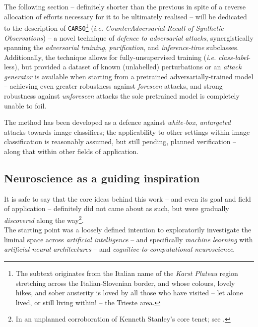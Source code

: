 

The following section -- definitely shorter than the previous in spite of a reverse allocation of efforts necessary for it to be ultimately realised -- will be dedicated to the description of \texttt{CARSO}\footnote{The subtext originates from the Italian name of the \textit{Karst Plateau} region stretching across the Italian-Slovenian border, and whose colours, lovely hikes, and sober austerity is loved by all those who have visited -- let alone lived, or still living within! --  the Trieste area.} (\textit{i.e.} \textit{CounterAdversarial Recall of Synthetic Observations}) -- a novel technique of \textit{defence to adversarial attacks}, synergistically spanning the \textit{adversarial training}, \textit{purification}, and \textit{inference-time} subclasses. Additionally, the technique allows for fully-unsupervised training (\textit{i.e.} \textit{class-label}-less), but provided a dataset of known (unlabelled) perturbations or an \textit{attack generator} is available when starting from a pretrained adversarially-trained model -- achieving even greater robustness against \textit{foreseen} attacks, and strong robustness against \textit{unforeseen} attacks the sole pretrained model is completely unable to foil.

The method has been developed as a defence against \textit{white-box}, \textit{untargeted} attacks towards image classifiers; the applicability to other settings within image classification is reasonably assumed, but still pending, planned verification -- along that within other fields of application.

\subsection{Neuroscience as a guiding inspiration}

It is safe to say that the core ideas behind this work -- and even its goal and field of application -- definitely did not came about as such, but were gradually \textit{discovered} along the way\footnote{In an unplanned corroboration of Kenneth Stanley's core tenet; see \cite{StanleyLehman2015WhyGreatness}.}.\\
The starting point was a loosely defined intention to exploratorily investigate the liminal space across \textit{artificial intelligence} -- and specifically \textit{machine learning} with \textit{artificial neural architectures} -- and \textit{cognitive-to-computational neuroscience}.

